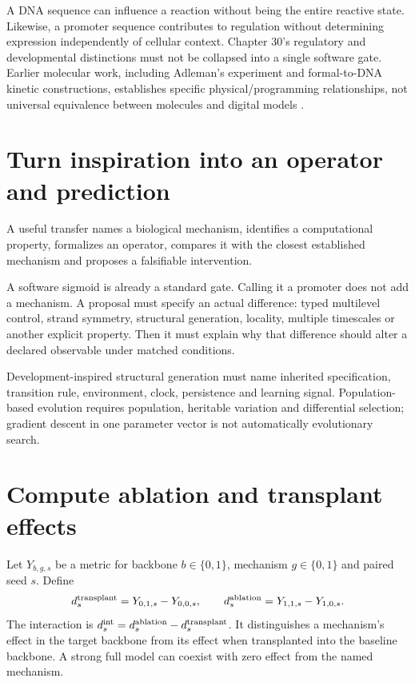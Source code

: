 A DNA sequence can influence a reaction without being the entire reactive state.
Likewise, a promoter sequence contributes to regulation without determining
expression independently of cellular context. Chapter 30's regulatory and
developmental distinctions must not be collapsed into a single software gate.
Earlier molecular work, including Adleman's experiment and formal-to-DNA
kinetic constructions, establishes specific physical/programming relationships,
not universal equivalence between molecules and digital models
\cite{dna32-adleman,dna32-soloveichik}.

\section{Turn inspiration into an operator and prediction}
A useful transfer names a biological mechanism, identifies a computational
property, formalizes an operator, compares it with the closest established
mechanism and proposes a falsifiable intervention.

A software sigmoid is already a standard gate. Calling it a promoter does not
add a mechanism. A proposal must specify an actual difference: typed multilevel
control, strand symmetry, structural generation, locality, multiple timescales
or another explicit property. Then it must explain why that difference should
alter a declared observable under matched conditions.

Development-inspired structural generation must name inherited specification,
transition rule, environment, clock, persistence and learning signal.
Population-based evolution requires population, heritable variation and
differential selection; gradient descent in one parameter vector is not
automatically evolutionary search.

\section{Compute ablation and transplant effects}
Let $Y_{b,g,s}$ be a metric for backbone $b\in\{0,1\}$, mechanism
$g\in\{0,1\}$ and paired seed $s$. Define
\[
 d^{\rm transplant}_s=Y_{0,1,s}-Y_{0,0,s},\qquad
 d^{\rm ablation}_s=Y_{1,1,s}-Y_{1,0,s}.
\]
The interaction is
$d^{\rm int}_s=d^{\rm ablation}_s-d^{\rm transplant}_s$.
It distinguishes a mechanism's effect in the target backbone from its effect
when transplanted into the baseline backbone. A strong full model can coexist
with zero effect from the named mechanism.
\par{}

